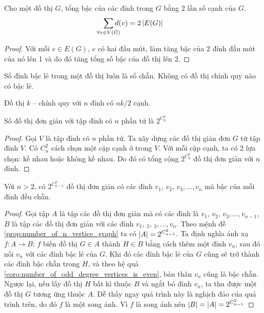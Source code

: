 \begin{theorem}
	\label{theo:tong_bac_cua_dinh} Cho một đồ thị $G$, tổng bậc của các đỉnh trong $G$ bằng 2 lần số cạnh của $G$.
	\begin{equation*}
		\sum_{\mathclap{\forall v \in V(G)}}d(v) = 2\abs{E(G)}
	\end{equation*}
	\begin{proof}
		Với mỗi $e \in E(G)$, $e$ có hai đầu mút, làm tăng bậc của $2$ đỉnh đầu mút của nó lên 1 và do đó tăng tổng số bậc của đồ thị lên 2.
	\end{proof}
\end{theorem}
\begin{corolarry}
	\label{coro:number_of_odd_degree_vertices_is_even}
Số đỉnh bậc lẻ trong một đồ thị luôn là số chẵn. Không có đồ thị chính quy nào có bậc lẻ.
\end{corolarry}
\begin{corolarry}
	Đồ thị $k$ -- chính quy với $n$ đỉnh có $nk/2$ cạnh.
\end{corolarry}

\begin{proposition}
	\label{prop:number_of_n_vertice_graph} Số đồ thị đơn giản với tập đỉnh có $n$ phần tử là $2^{C_n^2}$	
	\begin{proof}
		Gọi $V$ là tập đỉnh có $n$ phần tử. Ta xây dựng các đồ thị giản đơn $G$ từ tập đỉnh $V$. Có $C^2_n$ cách chọn một cặp cạnh ở trong $V$. Với mỗi cặp cạnh, ta có 2 lựa chọn: kề nhau hoặc không kề nhau. Do đó có tổng cộng $2^{C_n^2}$ đồ thị đơn giản với $n$ đỉnh.
	\end{proof}
\end{proposition}

\begin{proposition}
	Với $n > 2$, có $2^{C_{n-1}^2}$ đồ thị đơn giản có các đỉnh $v_1$, $v_2$, $v_3, \ldots, v_n$ mà bậc của mỗi đỉnh đều chẵn.
	\begin{proof}
		Gọi tập $A$ là tập các đồ thị đơn giản mà có các đỉnh là $v_1$, $v_2$, $v_3, \ldots, v_{n-1}$, $B$ là tập các đồ thị đơn giản với các đỉnh $v_1$, $_2$, $_3,\ldots,v_n$. Theo mệnh đề \ref{prop:number_of_n_vertice_graph} ta có $\left\lvert A\right\rvert = 2^{C_{n-1}^2}$. Ta định nghĩa ánh xạ $f:A\to B$: $f$ biến đồ thị $G \in A$ thành $H \in B$ bằng cách thêm một đỉnh $v_n$, sau đó nối $v_n$ với các đỉnh bậc lẻ của $G$. Khi đó các đỉnh bậc lẻ của $G$ cũng sẽ trở thành các đỉnh bậc chẵn trong $H$, và theo hệ quả \ref{coro:number_of_odd_degree_vertices_is_even}, bản thân $v_n$ cũng là bậc chẵn. Ngược lại, nếu lấy đồ thị $H$ bất kì thuộc $B$ và ngắt bỏ đỉnh $v_n$, ta thu được một đồ thị $G$ tương ứng thuộc $A$. Dễ thấy ngay quá trình này là nghịch đảo của quá trình trên, do đó $f$ là một song ánh. Vì $f$ là song ánh nên $\left\lvert B\right\rvert = \left\lvert A\right\rvert = 2^{C_{n-1}^2}$
	\end{proof}
\end{proposition}


